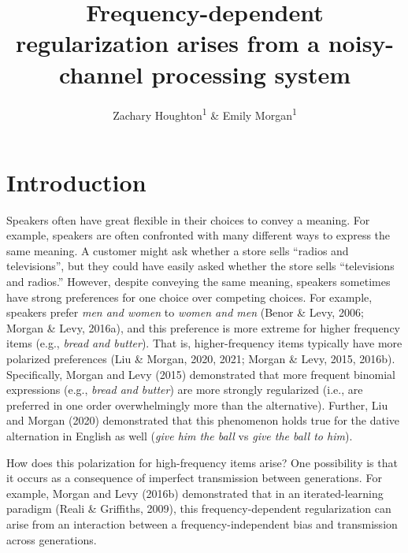\documentclass[
  jou,floatsintext]{apa6}
\title{Frequency-dependent regularization arises from a noisy-channel processing system}
\author{Zachary Houghton\textsuperscript{1} \& Emily Morgan\textsuperscript{1}}
\date{}
\affiliation{\vspace{0.5cm}\textsuperscript{1} University of California, Davis}
\begin{document}
\maketitle

\section{Introduction}\label{introduction}

Speakers often have great flexible in their choices to convey a meaning. For example, speakers are often confronted with many different ways to express the same meaning. A customer might ask whether a store sells ``radios and televisions'', but they could have easily asked whether the store sells ``televisions and radios.'' However, despite conveying the same meaning, speakers sometimes have strong preferences for one choice over competing choices. For example, speakers prefer \emph{men and women} to \emph{women and men} (Benor \& Levy, 2006; Morgan \& Levy, 2016a), and this preference is more extreme for higher frequency items (e.g., \emph{bread and butter}). That is, higher-frequency items typically have more polarized preferences (Liu \& Morgan, 2020, 2021; Morgan \& Levy, 2015, 2016b). Specifically, Morgan and Levy (2015) demonstrated that more frequent binomial expressions (e.g., \emph{bread and butter}) are more strongly regularized (i.e., are preferred in one order overwhelmingly more than the alternative). Further, Liu and Morgan (2020) demonstrated that this phenomenon holds true for the dative alternation in English as well (\emph{give him the ball} vs \emph{give the ball to him}).

How does this polarization for high-frequency items arise? One possibility is that it occurs as a consequence of imperfect transmission between generations. For example, Morgan and Levy (2016b) demonstrated that in an iterated-learning paradigm (Reali \& Griffiths, 2009), this frequency-dependent regularization can arise from an interaction between a frequency-independent bias and transmission across generations.
\end{document}
